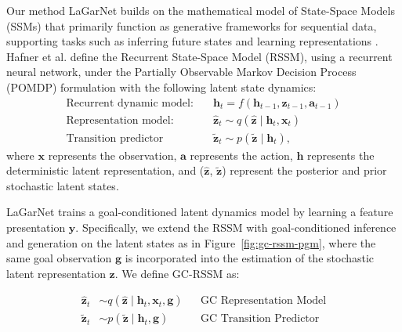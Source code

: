 \documentclass[journal]{IEEEtran}
\newcommand{\addinfo}[1]{\textcolor{myPurple}{#1}}
\begin{document}
\addinfo{Our method LaGarNet builds on the mathematical model of State-Space Models (SSMs) that} primarily function as generative frameworks for sequential data, supporting tasks such as inferring future states and learning representations \cite{ma2024interpretable}. Hafner et al. \cite{hafner2019learning} define the Recurrent State-Space Model (RSSM), using a recurrent neural network, under the Partially Observable Markov Decision Process (POMDP) formulation with the following latent state dynamics:
\begin{equation}
\begin{aligned}
    \text{Recurrent dynamic model:} & \quad \bm{h}_t=f(\bm{h}_{t-1},\bm{z}_{t-1},\bm{a}_{t-1}) \\
    \text{Representation model:}    & \quad \hat{\bm{z}}_t\sim q(\hat{\bm{z}}\;|\;\bm{h}_t,\bm{x}_t) \\
    \text{Transition predictor}    & \quad \tilde{\bm{z}}_t\sim p(\tilde{\bm{z}}\;|\;\bm{h}_{t}),
\end{aligned}
\end{equation}
where $\bm{x}$ represents the observation, $\bm{a}$ represents the action, $\bm{h}$ represents the deterministic latent representation, and ($\hat{\bm{z}}$, $\tilde{\bm{z}}$) represent the posterior and prior stochastic latent states. 

LaGarNet trains a goal-conditioned latent dynamics model by learning a feature presentation $\bm{y}$. Specifically, we extend the RSSM with goal-conditioned inference and generation on the latent states as in Figure~\ref{fig:gc-rssm-pgm}, where the same goal observation $\bm{g}$ is incorporated into the estimation of the stochastic latent representation $\bm{z}$. We define GC-RSSM as:

\begin{align}
    \hat{\bm{z}}_t &\sim q(\hat{\bm{z}} \;|\; \bm{h}_t, \bm{x}_t, \bm{g}) 
    && \text{GC Representation Model} \label{eq:gc-repr} \\
    \tilde{\bm{z}}_t &\sim p(\tilde{\bm{z}} \;|\; \bm{h}_t, \bm{g}) 
    && \text{GC Transition Predictor} \label{eq:gc-trans}
\end{align}
\end{document}
